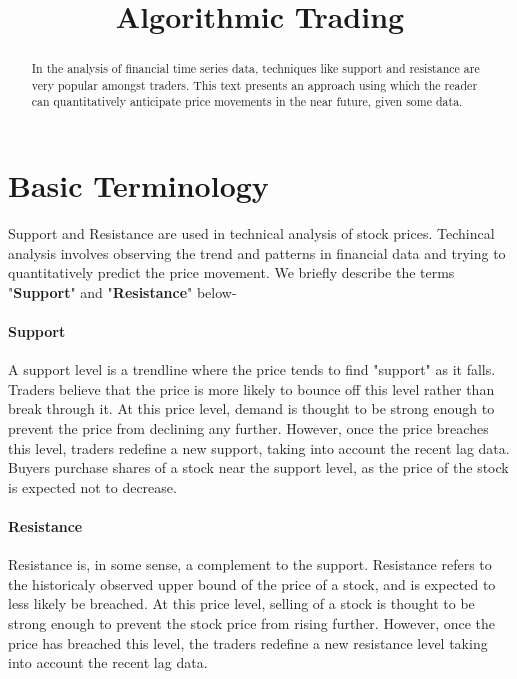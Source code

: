 \documentclass[letterpaper, 12pt] {article}
\begin{document}
	
	\title{Algorithmic Trading}
	
	\date{\vspace{-5ex}}
	\maketitle
	
	\begin{abstract}
	In the analysis of financial time series data, techniques like support and resistance are very popular amongst traders. This text presents an approach using which the  reader can quantitatively anticipate price movements in the near future, given some data. 
	\end{abstract}

	\section{\textbf{Basic Terminology}}
	
	Support and Resistance are used in technical analysis of stock prices. Techincal analysis involves observing the trend and patterns in financial data and trying to quantitatively predict the price movement. We briefly describe the terms "\textbf{Support}" and "\textbf{Resistance}" below-
	
	\paragraph{Support} A support level is a trendline where the price tends to find "support" as it falls. Traders believe that the price is more likely to bounce off this level rather than break through it. At this price level, demand is thought to be strong enough to prevent the price from declining any further. However, once the price breaches this level, traders redefine a new support, taking into account the recent lag data. Buyers purchase shares of a stock near the support level, as the price of the stock is expected not to decrease.
	
	\paragraph{Resistance} Resistance is, in some sense, a complement to the support. Resistance refers to the historicaly observed upper bound of the price of a stock, and  is expected to less likely be breached. At this price level, selling of a stock is thought to be strong enough to prevent the stock price from rising further. However, once the price has breached this level, the traders redefine a new resistance level taking into account the recent lag data. 
	
\end{document}
